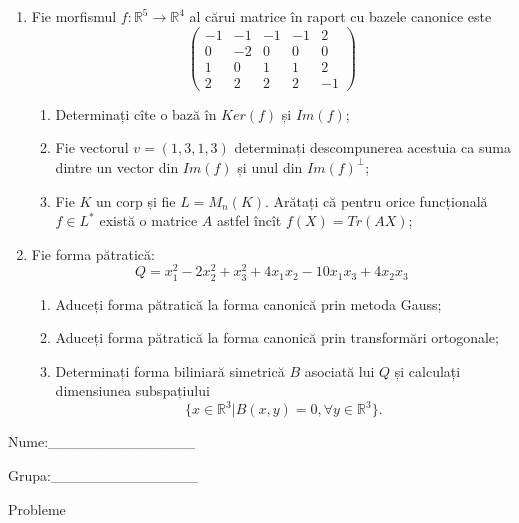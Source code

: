 \documentclass{article}
\begin{document}
\begin{enumerate}
 \item Fie morfismul $f:\mathbb{R}^5 \to \mathbb{R}^4$ al cărui matrice în raport cu bazele canonice este
$$\begin{pmatrix}
-1&-1&-1&-1&2\\
0&-2&0&0&0\\
1&0&1&1&2\\
2&2&2&2&-1
\end{pmatrix}$$

\begin{enumerate}
\item Determinați cîte o bază în $Ker(f)$ și $Im(f)$;
\item Fie vectorul $v=(1,3,1,3)$ determinați descompunerea acestuia ca suma dintre un vector din $Im(f)$ și unul din $Im(f)^\perp$;
\item Fie $K$ un corp și fie $L=M_n(K)$. Arătați că pentru orice funcțională $f \in L^*$ există o matrice $A$ astfel încît $f(X)=Tr(AX)$;
\end{enumerate}
\item Fie forma pătratică:
$$Q= x_1^2-2x_2^2+x_3^2+4x_1x_2-10x_1x_3+4x_2x_3$$

\begin{enumerate}
\item Aduceți forma pătratică la forma canonică prin metoda Gauss;
\item Aduceți forma pătratică la forma canonică prin transformări ortogonale;
\item Determinați forma biliniară simetrică $B$ asociată lui $Q$ și calculați dimensiunea subspațiului
$$\{x \in \mathbb{R}^3 | B(x,y)=0,\forall y \in \mathbb{R}^3\}.$$

\end{enumerate}
\end{enumerate}
\newpage
\begin{flushright}
Nume:\_\_\_\_\_\_\_\_\_\_\_\_\_\_
 
 
Grupa:\_\_\_\_\_\_\_\_\_\_\_\_\_\_
\end{flushright}
\begin{center}
\vspace{2cm}
{\Large Probleme}
\vspace{2cm}
\end{center}
\end{document}
